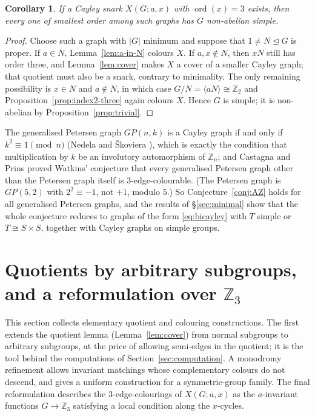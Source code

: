 \documentclass[11pt,a4paper]{article}
\newtheorem{corollary}[theorem]{Corollary}
\theoremstyle{definition}
\theoremstyle{remark}
\newcommand{\ord}{\operatorname{ord}}
\newcommand{\ZZ}{\mathbb{Z}}
\newcommand{\X}[3]{X(#1;#2,#3)}
\begin{document}
\begin{corollary}\label{cor:three-simple}
If a Cayley snark $\X{G}{a}{x}$ with $\ord(x)=3$ exists, then every one of smallest order among such graphs has $G$ non-abelian simple.
\end{corollary}
\begin{proof}
Choose such a graph with $|G|$ minimum and suppose that $1\ne N\trianglelefteq G$ is proper.  If $a\in N$, Lemma~\ref{lem:a-in-N} colours $X$.  If $a,x\notin N$, then $xN$ still has order three, and Lemma~\ref{lem:cover} makes $X$ a cover of a smaller Cayley graph; that quotient must also be a snark, contrary to minimality.  The only remaining possibility is $x\in N$ and $a\notin N$, in which case $G/N=\langle aN\rangle\cong\ZZ_2$ and Proposition~\ref{prop:index2-three} again colours $X$.  Hence $G$ is simple; it is non-abelian by Proposition~\ref{prop:trivial}.
\end{proof}

The generalised Petersen graph $GP(n,k)$ is a Cayley graph if and only if $k^2\equiv1\pmod n$ (Nedela and \v{S}koviera \cite{NS95b}), which is exactly the condition that multiplication by $k$ be an involutory automorphism of $\ZZ_n$; and Castagna and Prins \cite{CastagnaPrins72} proved Watkins' conjecture that every generalised Petersen graph other than the Petersen graph itself is $3$-edge-colourable.  (The Petersen graph is $GP(5,2)$ with $2^2\equiv-1$, not $+1$, modulo $5$.)  So Conjecture~\ref{conj:AZ} holds for all generalised Petersen graphs, and the results of \S\ref{sec:minimal} show that the whole conjecture reduces to graphs of the form \eqref{eq:bicayley} with $T$ simple or $T\cong S\times S$, together with Cayley graphs on simple groups.

\section{Quotients by arbitrary subgroups, and a reformulation over $\mathbb{Z}_3$}\label{sec:new}

This section collects elementary quotient and colouring constructions.  The first extends the quotient lemma (Lemma~\ref{lem:cover}) from normal subgroups to arbitrary subgroups, at the price of allowing semi-edges in the quotient; it is the tool behind the computations of Section~\ref{sec:computation}.  A monodromy refinement allows invariant matchings whose complementary colours do not descend, and gives a uniform construction for a symmetric-group family.  The final reformulation describes the $3$-edge-colourings of $\X{G}{a}{x}$ as the $a$-invariant functions $G\to\ZZ_3$ satisfying a local condition along the $x$-cycles.
\end{document}
